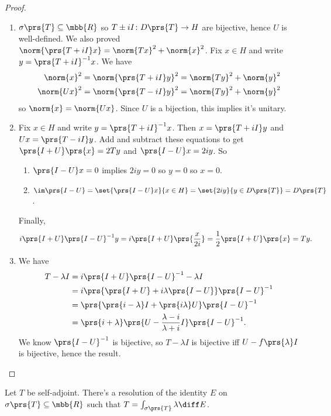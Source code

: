 \documentclass[10pt, twoside]{book}
\begin{document}
\begin{proof}
\begin{enumerate}
\item $\sigma\prs{T} \subseteq \mbb{R}$ so $T \pm iI \colon D\prs{T} \to H$ are bijective, hence $U$ is well-defined. We also proved $\norm{\prs{T+iI}x} = \norm{Tx}^2 + \norm{x}^2$. Fix $x \in H$ and write $y = \prs{T + iI}^{-1} x$. We have
\begin{align*}
\norm{x}^2 &= \norm{\prs{T +i I}y}^2 = \norm{Ty}^2 + \norm{y}^2 \\
\norm{Ux}^2 &= \norm{\prs{T - iI}y}^2 = \norm{Ty}^2 + \norm{y}^2
\end{align*}
so $\norm{x} = \norm{Ux}$. Since $U$ is a bijection, this implies it's unitary.
\item Fix $x \in H$ and write $y = \prs{T + iI}^{-1} x$. Then $x =\prs{T + iI} y$ and $Ux = \prs{T - iI}y$. Add and subtract these equations to get $\prs{I+U}\prs{x} = 2Ty$ and $\prs{I-U}x = 2iy$.
So
\begin{enumerate}
\item $\prs{I-U} x = 0$ implies $2iy = 0$ so $y = 0$ so $x = 0$.
\item $\im\prs{I-U} = \set{\prs{I-U}x}{x \in H} = \set{2iy}{y \in D\prs{T}} = D\prs{T}$.
\end{enumerate}
Finally,
\[i\prs{I+U}\prs{I-U}^{-1}y = i\prs{I+U}\prs{\frac{x}{2i}} = \frac{1}{2} \prs{I+U}\prs{x} = Ty \text{.}\]
\item We have
\begin{align*}
T-\lambda I &= i\prs{I+U}\prs{I-U}^{-1} - \lambda I
\\&= i\prs{\prs{I+U} + i \lambda \prs{I -U}}\prs{I-U}^{-1}
\\&= \prs{\prs{i - \lambda}I + \prs{i \lambda} U} \prs{I-U}^{-1}
\\&= \prs{i+\lambda}\prs{U - \frac{\lambda - i}{\lambda +i} I}\prs{I-U}^{-1} \text{.}
\end{align*}
We know $\prs{I-U}^{-1}$ is bijective, so $T - \lambda I$ is bijective iff $U - f\prs{\lambda}I$ is bijective, hence the result.
\end{enumerate}
\end{proof}

\begin{theorem}
Let $T$ be self-adjoint. There's a resolution of the identity $E$ on $\sigma\prs{T} \subseteq \mbb{R}$ such that $T = \int_{\sigma\prs{T}} \lambda \diff E$.
\end{theorem}
\end{document}

